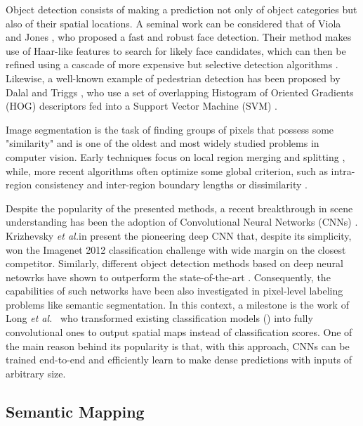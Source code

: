 \documentclass{article}
\newcommand\etal{\emph{et al.}}
\begin{document}
	Object detection consists of making a prediction not only of object categories but also of their spatial locations. A seminal work can be considered that of Viola and Jones \cite{viola2004ijcv}, who proposed a fast and robust face detection. Their method makes use of Haar-like features \cite{papageorgiou1998iccv} to search for likely face candidates, which can then be refined using a cascade of more expensive but selective detection algorithms \cite{freund1997jcss}. Likewise, a well-known example of pedestrian detection has been proposed by Dalal and Triggs \cite{dalal2005cvpr}, who use a set of overlapping Histogram of Oriented Gradients (HOG) descriptors fed into a Support Vector Machine (SVM) \cite{cortes1995support}.
	
	Image segmentation is the task of finding groups of pixels that possess some "similarity" and is one of the oldest and most widely studied problems in computer vision.
	Early techniques focus on local region merging and splitting \cite{ohlander1978picture,brice1970scene}, while, more recent algorithms often optimize some global criterion, such as intra-region consistency and inter-region boundary lengths or dissimilarity \cite{comaniciu2002pami,shi2000pami,felzenszwalb2004ijcv,chan2001ip,osher1988jcp}. 
	
	Despite the popularity of the presented methods, a recent breakthrough in scene understanding has been the adoption of Convolutional Neural Networks (CNNs) \cite{garcia2017review}. Krizhevsky \etal in \cite{krizhevsky2012nipsjournal} present the pioneering deep CNN that, despite its simplicity, won the Imagenet 2012 classification challenge with wide margin on the closest competitor. Similarly, different object detection methods based on deep neural netowrks have shown to outperform the state-of-the-art \cite{redmon2016cvpr,erhan2014cvpr,liu2016eccv}. Consequently, the capabilities of such networks have been also investigated in pixel-level labeling problems like semantic segmentation. In this context, a milestone is the work of Long \etal~\cite{long2015cvpr} who transformed existing classification models (\cite{simonyan2014very,szegedy2015cvpr}) into fully convolutional ones to output spatial maps instead of classification scores. One of the main reason behind its popularity is that, with this approach, CNNs can be trained end-to-end and efficiently learn to make dense predictions with inputs of arbitrary size.
	
	\subsection*{Semantic Mapping}
	
\end{document}
